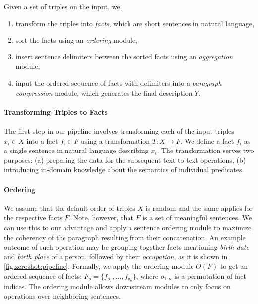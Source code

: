 Given a set of triples on the input, we:
\begin{enumerate}
    \item transform the triples into \textit{facts}, which are short sentences in natural language,
    \item sort the facts using an \textit{ordering} module,
    \item insert sentence delimiters between the sorted facts using an \textit{aggregation} module,
    \item input the ordered sequence of facts with delimiters into a \textit{paragraph compression} module, which generates the final description $Y$.
\end{enumerate}

\paragraph{Transforming Triples to Facts}

The first step in our pipeline involves transforming each of the input triples $x_i \in X$ into a fact $f_i \in F$  using a transformation $T: X \rightarrow F$. We define a fact $f_i$ as a single sentence in natural language describing $x_i$.
The transformation serves two purposes: (a) preparing the data for the subsequent text-to-text operations, (b) introducing in-domain knowledge about the semantics of individual predicates.




\paragraph{Ordering} We assume that the default order of triples $X$ is random and the same applies for the respective facts $F$. Note, however, that $F$ is a set of meaningful sentences. We can use this to our advantage and apply a sentence ordering module \cite{barzilay2001sentence,lapata2003probabilistic} to maximize the coherency of the paragraph resulting from their concatenation. An example outcome of such operation may be grouping together facts mentioning \textit{birth date} and \textit{birth place} of a person, followed by their \textit{occupation}, as it is shown in \autoref{fig:zeroshot:pipeline}.
Formally, we apply the ordering module $O(F)$ to get an ordered sequence of facts: $F_o = \{f_{o_1}, \ldots, f_{o_n}\}$, where $o_{1:n}$ is a permutation of fact indices. The ordering module allows downstream modules to only focus on operations over neighboring sentences.


